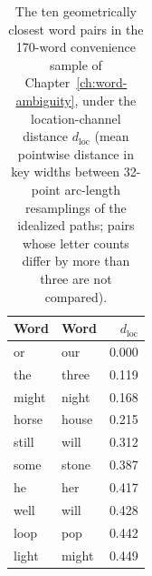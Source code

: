 \begin{table}[t]
\centering
\small
\begin{tabular}{llr}
\toprule
Word & Word & $d_{\mathrm{loc}}$ \\
\midrule
or & our & 0.000 \\
the & three & 0.119 \\
might & night & 0.168 \\
horse & house & 0.215 \\
still & will & 0.312 \\
some & stone & 0.387 \\
he & her & 0.417 \\
well & will & 0.428 \\
loop & pop & 0.442 \\
light & might & 0.449 \\
\bottomrule
\end{tabular}
\caption{The ten geometrically closest word pairs in the 170-word convenience sample of Chapter~\ref{ch:word-ambiguity}, under the location-channel distance $d_{\mathrm{loc}}$ (mean pointwise distance in key widths between 32-point arc-length resamplings of the idealized paths; pairs whose letter counts differ by more than three are not compared).}
\label{tab:closest-pairs}
\end{table}
